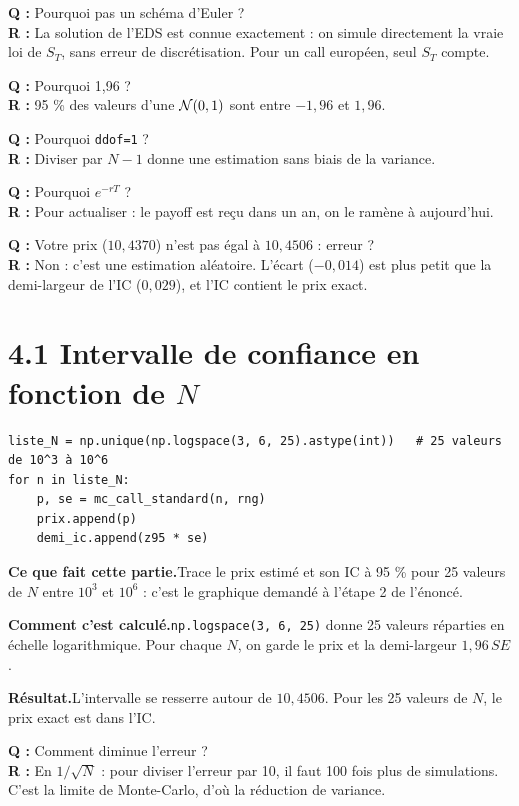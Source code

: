 \documentclass[11pt,a4paper]{article}
\newcommand{\quoi}[1]{\par\noindent\textbf{\color{bleu}Ce que fait cette partie.}\enspace #1\par}
\newcommand{\calcul}[1]{\par\noindent\textbf{\color{bleu}Comment c'est calculé.}\enspace #1\par}
\newcommand{\resultat}[1]{\par\noindent\textbf{\color{vert}Résultat.}\enspace #1\par}
\newcommand{\prof}[2]{\begin{tcolorbox}[colback=orange!6,colframe=orange!80,boxrule=0.4pt,arc=2pt,left=5pt,right=5pt,top=2pt,bottom=2pt]\small\textbf{Q :} #1\\[1pt]\textbf{R :} #2\end{tcolorbox}}
\newcommand{\sect}[1]{\clearpage\section{#1}}
\begin{document}
\prof{Pourquoi pas un schéma d'Euler ?}{La solution de l'EDS est connue exactement : on simule directement la vraie loi de $S_T$, sans erreur de discrétisation. Pour un call européen, seul $S_T$ compte.}
\prof{Pourquoi 1,96 ?}{95 \% des valeurs d'une $\mathcal{N}(0,1)$ sont entre $-1{,}96$ et $1{,}96$.}
\prof{Pourquoi \texttt{ddof=1} ?}{Diviser par $N-1$ donne une estimation sans biais de la variance.}
\prof{Pourquoi $e^{-rT}$ ?}{Pour actualiser : le payoff est reçu dans un an, on le ramène à aujourd'hui.}
\prof{Votre prix ($10{,}4370$) n'est pas égal à $10{,}4506$ : erreur ?}{Non : c'est une estimation aléatoire. L'écart ($-0{,}014$) est plus petit que la demi-largeur de l'IC ($0{,}029$), et l'IC contient le prix exact.}

\sect{4.1 Intervalle de confiance en fonction de $N$}
\begin{lstlisting}
liste_N = np.unique(np.logspace(3, 6, 25).astype(int))   # 25 valeurs de 10^3 à 10^6
for n in liste_N:
    p, se = mc_call_standard(n, rng)
    prix.append(p)
    demi_ic.append(z95 * se)
\end{lstlisting}
\quoi{Trace le prix estimé et son IC à 95 \% pour 25 valeurs de $N$ entre $10^3$ et $10^6$ : c'est le graphique demandé à l'étape 2 de l'énoncé.}
\calcul{\texttt{np.logspace(3, 6, 25)} donne 25 valeurs réparties en échelle logarithmique. Pour chaque $N$, on garde le prix et la demi-largeur $1{,}96\,SE$.}
\resultat{L'intervalle se resserre autour de $10{,}4506$. Pour les 25 valeurs de $N$, le prix exact est dans l'IC.}
\prof{Comment diminue l'erreur ?}{En $1/\sqrt N$ : pour diviser l'erreur par 10, il faut 100 fois plus de simulations. C'est la limite de Monte-Carlo, d'où la réduction de variance.}
\end{document}
